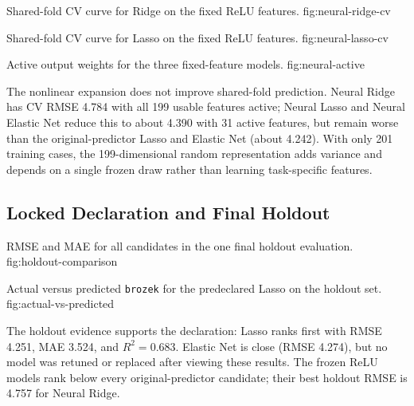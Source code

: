%
  {Shared-fold CV curve for Ridge on the fixed ReLU features.}%
  {fig:neural-ridge-cv}

%
  {Shared-fold CV curve for Lasso on the fixed ReLU features.}%
  {fig:neural-lasso-cv}

%
  {Active output weights for the three fixed-feature models.}%
  {fig:neural-active}



The nonlinear expansion does not improve shared-fold prediction.  Neural Ridge
has CV RMSE 4.784 with all 199 usable features active; Neural Lasso and Neural
Elastic Net reduce this to about 4.390 with 31 active features, but remain worse
than the original-predictor Lasso and Elastic Net (about 4.242).  With only 201
training cases, the 199-dimensional random representation adds variance and
depends on a single frozen draw rather than learning task-specific features.

\subsection{Locked Declaration and Final Holdout}
\label{sec:holdout}

\noindent
{}



%
  {RMSE and MAE for all candidates in the one final holdout evaluation.}%
  {fig:holdout-comparison}

%
  {Actual versus predicted \texttt{brozek} for the predeclared Lasso on the holdout set.}%
  {fig:actual-vs-predicted}

The holdout evidence supports the declaration: Lasso ranks first with RMSE
4.251, MAE 3.524, and $R^2=0.683$.  Elastic Net is close (RMSE 4.274), but no
model was retuned or replaced after viewing these results.  The frozen ReLU
models rank below every original-predictor candidate; their best holdout RMSE
is 4.757 for Neural Ridge.

